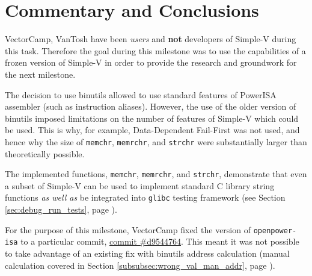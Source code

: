 \chapter{Commentary and Conclusions}

VectorCamp, VanTosh have been \textit{users} and \textbf{not} developers
of Simple-V during this task.
Therefore the goal during this milestone was to use the capabilities of a
frozen version of Simple-V in order to provide the research and
groundwork for the next milestone.

The decision to use binutils allowed to use standard features of
PowerISA assembler (such as instruction aliases).
However, the use of the older version of binutils imposed limitations
on the number of features of
Simple-V which could be used. This is why, for example,
Data-Dependent Fail-First was not used, and hence why the size of
\texttt{memchr}, \texttt{memrchr}, and \texttt{strchr} were
substantially larger than theoretically possible.

The implemented functions, \texttt{memchr}, \texttt{memrchr},
and \texttt{strchr}, demonstrate that even a subset of Simple-V can be used
to implement standard C library string functions \textit{as well as} be
integrated into \texttt{glibc} testing framework
(see Section \ref{sec:debug_run_tests}, page \pageref{sec:debug_run_tests}).

For the purpose of this milestone, VectorCamp fixed the version of
\texttt{openpower-isa} to a particular commit,
\href{https://git.libre-soc.org/?p=openpower-isa.git;a=commitdiff;h=d9544764b1710f3807a9c0685d150a665f70b9a2}{commit \#d9544764}.
This meant it was not possible to take advantage of an existing fix
with binutils address calculation (manual calculation covered in Section
\ref{subsubsec:wrong_val_man_addr},
page \pageref{subsubsec:wrong_val_man_addr}).
